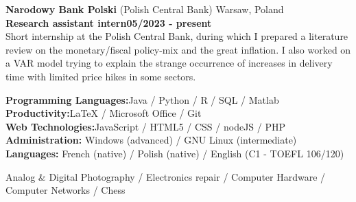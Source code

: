 \documentclass[11pt]{report}
\begin{document}
\noindent\textbf{Narodowy Bank Polski} (Polish Central Bank) \hfill Warsaw, Poland\\[0.1cm]
\textbf{Research assistant intern}\hfill \textbf{05/2023 - present} \\
Short internship at the Polish Central Bank, during which I prepared a literature review on the monetary/fiscal policy-mix and the great inflation. I also worked on a VAR model trying to explain the strange occurrence of increases in delivery time with limited price hikes in some sectors. 


	\begin{flushleft}
	 \hrulefill
	\end{flushleft}



  \noindent\textbf{Programming Languages:}\hfill{Java / Python / R / SQL / Matlab} \\
  \textbf{Productivity:}\hfill LaTeX / Microsoft Office / Git\\
  \textbf{Web Technologies:}\hfill JavaScript / HTML5 / CSS / nodeJS / PHP  \\
  \textbf{Administration:} \hfill Windows (advanced) / GNU Linux (intermediate)\\
  \textbf{Languages:} \hfill French (native) / Polish (native) / English (C1 - TOEFL 106/120) 

	\begin{flushleft}
	 \hrulefill
	\end{flushleft}

\noindent Analog \& Digital Photography / Electronics repair / Computer Hardware / Computer Networks  / Chess
\end{document}
